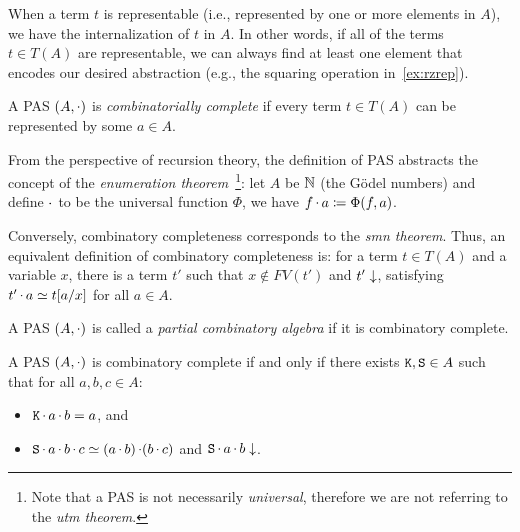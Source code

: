 When a term \(t\) is representable (i.e., represented by one or more elements in \(A\)), we have the internalization of \(t\) in \(A\).
In other words, if all of the terms \(t \in T(A)\) are representable, we can always find at least one element that encodes our desired abstraction (e.g., the squaring operation in~\cref{ex:rzrep}). %

\begin{definition}
    A PAS \((A, \mathop\cdot\nolimits)\) is \emph{combinatorially complete} if every term \(t \in T(A)\) can be represented by some \(a \in A\).
\end{definition}

\begin{remark}
    From the perspective of recursion theory, the definition of PAS abstracts the concept of the \emph{enumeration theorem}~\citep{kleene52:introduction_metamathematics}\footnote{Note that a PAS is not necessarily \emph{universal}, therefore we are not referring to the \emph{utm theorem}.}: let \(A\) be \(\mathbb N\) (the G\"odel numbers) and define \(\mathop\cdot\nolimits\) to be the universal function \(\Phi\), we have \(f \mathop\cdot\nolimits a \coloneq \Phi(f, a)\).
    
    Conversely, combinatory completeness corresponds to the \emph{smn theorem}.  Thus, an equivalent definition of combinatory completeness is: for a term \(t \in T(A)\) and a variable \(x\), there is a term \(t'\) such that \(x \notin FV(t')\) and \(t' \downarrow\), satisfying \(t' \mathop\cdot\nolimits a \simeq t[a/x]\) for all \(a \in A\).
\end{remark}

\begin{definition}
    A PAS \((A, \mathop\cdot\nolimits)\) is called a \emph{partial combinatory algebra} if it is combinatory complete.
\end{definition}

\begin{proposition}
    A PAS \((A, \mathop\cdot\nolimits)\) is combinatory complete if and only if there exists \(\mathtt{K}, \mathtt{S} \in A\) such that for all \(a, b, c \in A\):
    \begin{itemize}
        \item \(\mathtt{K} \mathop\cdot\nolimits a \mathop\cdot\nolimits b = a\), and
        \item \(\mathtt{S} \mathop\cdot\nolimits a \mathop\cdot\nolimits b \mathop\cdot\nolimits c \simeq (a \mathop\cdot\nolimits b) \mathop\cdot\nolimits (b \mathop\cdot\nolimits c)\) and \(\mathtt{S} \mathop\cdot\nolimits a \mathop\cdot\nolimits b \downarrow\).
    \end{itemize}
\end{proposition}

